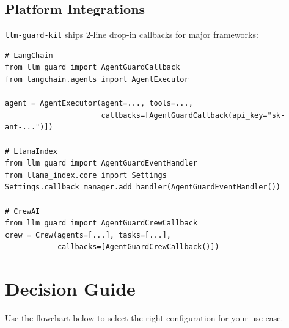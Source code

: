 \documentclass[11pt,a4paper]{article}
\begin{document}
\subsection{Platform Integrations}

\texttt{llm-guard-kit} ships 2-line drop-in callbacks for major frameworks:

\begin{lstlisting}
# LangChain
from llm_guard import AgentGuardCallback
from langchain.agents import AgentExecutor

agent = AgentExecutor(agent=..., tools=...,
                      callbacks=[AgentGuardCallback(api_key="sk-ant-...")])

# LlamaIndex
from llm_guard import AgentGuardEventHandler
from llama_index.core import Settings
Settings.callback_manager.add_handler(AgentGuardEventHandler())

# CrewAI
from llm_guard import AgentGuardCrewCallback
crew = Crew(agents=[...], tasks=[...],
            callbacks=[AgentGuardCrewCallback()])
\end{lstlisting}

\section{Decision Guide}

Use the flowchart below to select the right configuration for your use case.
\end{document}
